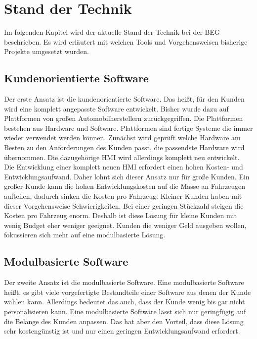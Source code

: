 \section{Stand der Technik}\label{standDerTechnik}

Im folgenden Kapitel wird der aktuelle Stand der Technik bei der \ac{BEG} beschrieben. Es wird erläutert mit welchen Tools und Vorgehensweisen bisherige Projekte umgesetzt wurden.\\

\subsection{Kundenorientierte Software}
Der erste Ansatz ist die kundenorientierte Software. Das heißt, für den Kunden wird eine komplett angepasste Software entwickelt. Bisher wurde dazu auf Plattformen von großen Automobilherstellern zurückgegriffen. Die Plattformen bestehen aus Hardware und Software. Plattformen sind fertige Systeme die immer wieder verwendet werden können. Zunächst wird geprüft welche Hardware am Besten zu den Anforderungen des Kunden passt, die passendste Hardware wird übernommen. Die dazugehörige \ac{HMI} wird allerdings komplett neu entwickelt.\\

Die Entwicklung einer komplett neuen \ac{HMI} erfordert einen hohen Kosten- und Entwicklungsaufwand. Daher lohnt sich dieser Ansatz nur für große Kunden. Ein großer Kunde kann die hohen Entwicklungskosten auf die Masse an Fahrzeugen aufteilen, dadurch sinken die Kosten pro Fahrzeug. Kleiner Kunden haben mit dieser Vorgehensweise Schwierigkeiten. Bei einer geringen Stückzahl steigen die Kosten pro Fahrzeug enorm. Deshalb ist diese Lösung für kleine Kunden mit wenig Budget eher weniger geeignet. Kunden die weniger Geld ausgeben wollen, fokussieren sich mehr auf eine modulbasierte Lösung.\\
  
\subsection{Modulbasierte Software}
Der zweite Ansatz ist die modulbasierte Software. Eine modulbasierte Software heißt, es gibt viele vorgefertigte Bestandteile einer Software aus denen der Kunde wählen kann. Allerdings bedeutet das auch, dass der Kunde wenig bis gar nicht personalisieren kann. Eine modulbasierte Software lässt sich nur geringfügig auf die Belange des Kunden anpassen. Das hat aber den Vorteil, dass diese Lösung sehr kostengünstig ist und nur einen geringen Entwicklungsaufwand erfordert.\\
 
